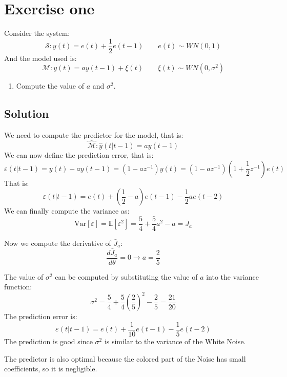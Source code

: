 \section{Exercise one}

Consider the system: 
\[\mathcal{S}:y(t)=e(t)+\dfrac{1}{2}e(t-1)\qquad e(t)\sim WN(0,1)\]
And the model used is: 
\[\mathcal{M}:y(t)=ay(t-1)+\xi(t)\qquad \xi(t)\sim WN(0,\sigma^2)\]
\begin{enumerate}
    \item Compute the value of $a$ and $\sigma^2$.
\end{enumerate}

\subsection{Solution}
We need to compute the predictor for the model, that is: 
\[\hat{\mathcal{M}}:\hat{y}(t|t-1)=ay(t-1)\]
We can now define the prediction error, that is: 
\[\varepsilon(t|t-1)=y(t)-ay(t-1)=\left(1-az^{-1}\right)y(t)=\left(1-az^{-1}\right)\left(1+\dfrac{1}{2}z^{-1}\right)e(t)\]
That is: 
\[\varepsilon(t|t-1)=e(t)+\left(\dfrac{1}{2}-a\right)e(t-1)-\dfrac{1}{2}ae(t-2)\]
We can finally compute the variance as: 
\[\text{Var}\left[\varepsilon\right]=\mathbb{E}\left[\varepsilon^2\right]=\dfrac{5}{4}+\dfrac{5}{4}a^2-a=\bar{J}_a\]

Now we compute the derivative of $\bar{J}_a$: 
\[\dfrac{d\bar{J}_a}{d\theta}=0\rightarrow a=\dfrac{2}{5}\]

The value of $\sigma^2$ can be computed by substituting the value of $a$ into the variance function: 
\[\sigma^2=\dfrac{5}{4}+\dfrac{5}{4}\left(\dfrac{2}{5}\right)^2-\dfrac{2}{5}=\dfrac{21}{20}\]
The prediction error is: 
\[\varepsilon(t|t-1)=e(t)+\dfrac{1}{10}e(t-1)-\dfrac{1}{5}e(t-2)\]
The prediction is good since $\sigma^2$ is similar to the variance of the White Noise. 

The predictor is also optimal because the colored part of the Noise has small coefficients, so it is negligible. 